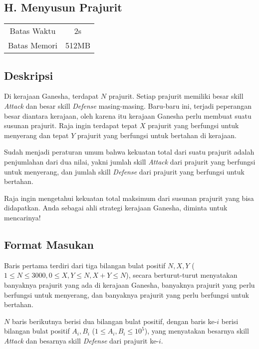 \documentclass{article}
\begin{document}
\begin{center}
    \section*{H. Menyusun Prajurit} %

    \begin{tabular}{ | c c | }
        \hline
        Batas Waktu  & 2s \\    %
        Batas Memori & 512MB \\  %
        \hline
    \end{tabular}
\end{center}

\subsection*{Deskripsi}

Di kerajaan Ganesha, terdapat $N$ prajurit. Setiap prajurit memiliki besar skill \textit{Attack} dan besar skill \textit{Defense} masing-masing. Baru-baru ini, terjadi peperangan besar diantara kerajaan, oleh karena itu kerajaan Ganesha perlu membuat suatu susunan prajurit. Raja ingin terdapat tepat $X$ prajurit yang berfungsi untuk menyerang dan tepat $Y$ prajurit yang berfungsi untuk bertahan di kerajaan.

Sudah menjadi peraturan umum bahwa kekuatan total dari suatu prajurit adalah penjumlahan dari dua nilai, yakni jumlah skill \textit{Attack} dari prajurit yang berfungsi untuk menyerang, dan jumlah skill \textit{Defense} dari prajurit yang berfungsi untuk bertahan.

Raja ingin mengetahui kekuatan total maksimum dari susunan prajurit yang bisa didapatkan. Anda sebagai ahli strategi kerajaan Ganesha, diminta untuk mencarinya!

\subsection*{Format Masukan}

Baris pertama terdiri dari tiga bilangan bulat positif $N, X, Y$ ($1 \leq N \leq 3000, 0 \leq X, Y \leq N, X + Y \leq N$), secara berturut-turut menyatakan banyaknya prajurit yang ada di kerajaan Ganesha, banyaknya prajurit yang perlu berfungsi untuk menyerang, dan banyaknya prajurit yang perlu berfungsi untuk bertahan.

$N$ baris berikutnya berisi dua bilangan bulat positif, dengan baris ke-$i$ berisi bilangan bulat positif $A_i, B_i$ ($1 \leq A_i, B_i \leq 10^5$), yang menyatakan besarnya skill \textit{Attack} dan besarnya skill \textit{Defense} dari prajurit ke-$i$.
\end{document}
